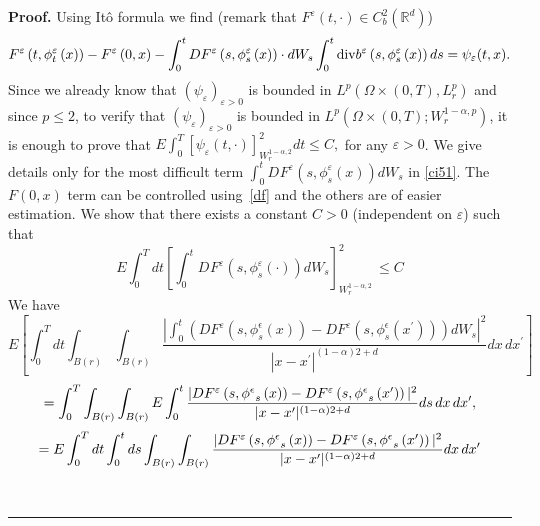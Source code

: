 \documentclass[a4paper,11pt]{article}
\newenvironment{proof}[1][Proof]{\textbf{#1.} }{\ \rule{0.5em}{0.5em}}
\newcommand{\RR}{\mathbb{R}}
\newcommand{\eps}{\varepsilon}
\begin{document}
\begin{proof}
  Using It\^{o} formula we find (remark that
 $F^{\eps}(t, \cdot) \in C^{2}_b(\RR^d)$)
\begin{equation} \label{ci51}
F^{\varepsilon }\left( t,{\phi }_{t}^{\varepsilon }\left( x\right)
\right)
-F^{\varepsilon }\left( 0,x\right) -\int_{0}^{t}DF^{\varepsilon }\left( s,{%
\phi }_{s}^{\varepsilon }\left( x\right) \right) \cdot dW_{s}\int_{0}^{t}%
\mathrm{div}b^{\varepsilon }\left( s,{\phi }_{s}^{\varepsilon
}\left( x\right) \right) ds = \psi _{\varepsilon }(t,x ).
\end{equation}
Since we already know that $\left( \psi _{\varepsilon }\right)
_{\varepsilon >0}$ is bounded in $L^{p}(\Omega \times
(0,T),L_{r}^{p})$ and since $p\le 2$, to verify that $\left( \psi _{\varepsilon
}\right) _{\varepsilon >0}$ is bounded in $L^{p}(\Omega \times
(0,T);W_{r}^{1-\alpha,p})$, it is enough to prove that
$
E \int_0^T [\psi _{\varepsilon }(t, \cdot)]_{W_{r}^{1-\alpha,2}}^2
dt \le C,
$
for any $\eps >0$. We give details only for the
most difficult term $\int_{0}^{t}D^{}F^{\varepsilon }(s,{\phi }
 _{s}^{\eps}(x))  dW_{s}$ in \eqref{ci51}. The $F(0,x)$ term can be controlled using~\eqref{df} and the others are of easier estimation.
 We show  that  there exists  a constant $C>0$ (independent on  $\eps$)
 such that
\begin{equation}
E \int_{0}^{T} dt \left [ \int_{0}^{t}D^{}F^{\varepsilon }\left(
s,{\phi }_{s}^{\eps}\left( \cdot\right) \right) dW_{s}\right
]_{W_{r}^{1-\alpha,2}}^{2} \, \leq C \label{cia2}
\end{equation}
 We have
$$
E\left[
\int_{0}^{T}dt\int_{B(r)}\int_{B(r)}\frac{|\int_{0}^{t}(DF^{\varepsilon
}\left( s,{\phi}^{\epsilon}_s \left( x\right) \right)
-DF^{\varepsilon }\left( s, {\phi}^{\epsilon}_{s}\left( x^{\prime
}\right) \right) )dW_{s}|^{2}}{|x-x^{\prime }|^{(1 - \alpha)2 + d
}}dx\,dx^{\prime }\right]
$$
$$
= \int_{0}^{T}    \int_{B(r)}\int_{B(r)} E
\int_{0}^{t}\frac{|DF^{\varepsilon }\left(
s,{{\phi}^{\epsilon}}_{s}\left( x\right) \right)
-DF^{\varepsilon }\left( s,{%
{\phi}^{\epsilon}}_{s}\left( x^{\prime }\right) \right)
|^{2}}{|x-x^{\prime }|^{(1 - \alpha)2 + d } }ds \,  dx\,dx^{\prime }
,
$$
\begin{equation*}
=  E \int_{0}^{T}dt  \int_{0}^{t}ds
\int_{B(r)}\int_{B(r)}\frac{|DF^{\varepsilon }\left(
s,{{\phi}^{\epsilon}}_{s}\left( x\right) \right)
-DF^{\varepsilon }\left( s,{%
{\phi}^{\epsilon}}_{s}\left( x^{\prime }\right) \right)
|^{2}}{|x-x^{\prime }|^{(1 - \alpha)2 + d } }dx\,dx^{\prime }
\end{equation*}

\end{proof}
\end{document}
